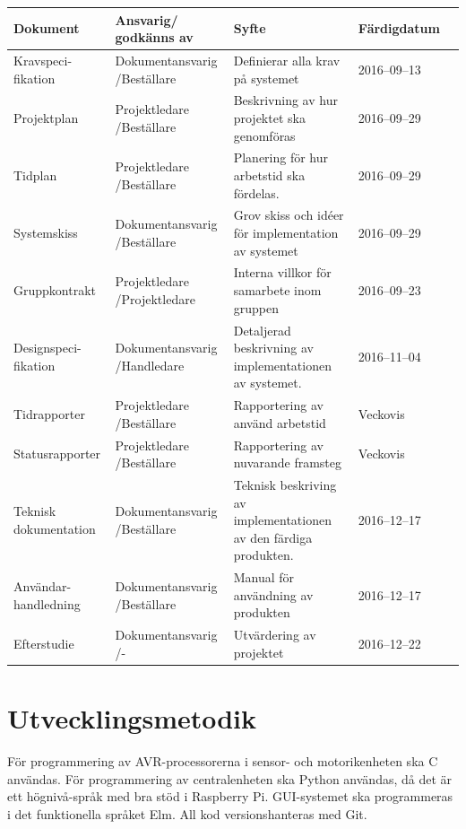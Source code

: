 \documentclass[a4paper,titlepage,12pt]{article}
\begin{document}
	\begin{longtable}[l]{ p{3cm} p{3.2cm} >{\raggedright}p{5cm} p{2.2cm} l }
		\textbf{Dokument} & \textbf{Ansvarig/ godkänns av} & \textbf{Syfte} & \textbf{Färdigdatum} \\ \midrule
		
		Kravspeci-fikation & Dokumentansvarig /Beställare & Definierar alla krav på systemet & 2016--09--13 \\ \midrule

		Projektplan & Projektledare /Beställare & Beskrivning av hur projektet ska genomföras & 2016--09--29 \\ \midrule

		Tidplan & Projektledare /Beställare & Planering för hur arbetstid ska fördelas. & 2016--09--29  \\ \midrule
		
		Systemskiss & Dokumentansvarig /Beställare & Grov skiss och idéer för implementation av systemet & 2016--09--29 \\ \midrule

        Gruppkontrakt & Projektledare /Projektledare & Interna villkor för samarbete inom
        gruppen & 2016--09--23 \\ \midrule

		Designspeci-fikation & Dokumentansvarig /Handledare & Detaljerad beskrivning av implementationen av systemet. & 2016--11--04 \\ \midrule

		Tidrapporter & Projektledare /Beställare & Rapportering av använd arbetstid & Veckovis		\\ \midrule

		Statusrapporter & Projektledare /Beställare & Rapportering av nuvarande framsteg & Veckovis \\ \midrule

		Teknisk dokumentation & Dokumentansvarig /Beställare & Teknisk beskriving av
		implementationen av den färdiga produkten. & 2016--12--17 \\ \midrule

		Användar-handledning & Dokumentansvarig /Beställare & Manual för användning av produkten & 2016--12--17 \\ \midrule

		Efterstudie & Dokumentansvarig /- & Utvärdering av projektet & 2016--12--22  \\ \midrule
	\end{longtable}
	
	
	\section{Utvecklingsmetodik}
	För programmering av AVR-processorerna i sensor- och motorikenheten ska C
	användas. För programmering av centralenheten ska Python användas, då det
	är ett högnivå-språk med bra stöd i Raspberry Pi. GUI-systemet ska
	programmeras i det funktionella språket Elm. All kod versionshanteras med Git.
	
\end{document}
